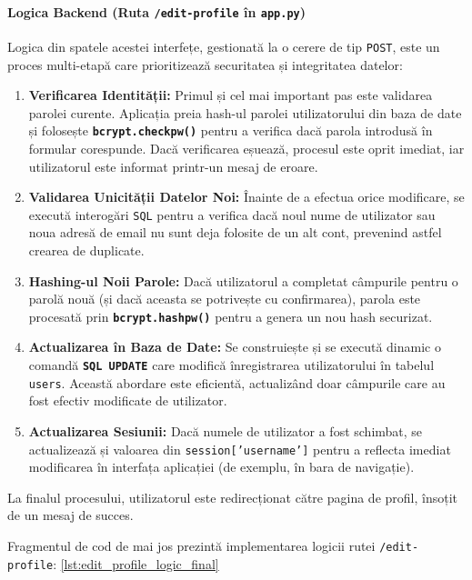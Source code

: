 \documentclass[12pt, a4paper, oneside, romanian]{teza-upb}
\begin{document}
\paragraph{Logica Backend (Ruta \texttt{/edit-profile} în \texttt{app.py})}
Logica din spatele acestei interfețe, gestionată la o cerere de tip \texttt{POST}, este un proces multi-etapă care prioritizează securitatea și integritatea datelor:
\begin{enumerate}
	\item \textbf{Verificarea Identității:} Primul și cel mai important pas este validarea parolei curente. Aplicația preia hash-ul parolei utilizatorului din baza de date și folosește \textbf{\texttt{bcrypt.checkpw()}} pentru a verifica dacă parola introdusă în formular corespunde. Dacă verificarea eșuează, procesul este oprit imediat, iar utilizatorul este informat printr-un mesaj de eroare.
	
	\item \textbf{Validarea Unicității Datelor Noi:} Înainte de a efectua orice modificare, se execută interogări \texttt{SQL} pentru a verifica dacă noul nume de utilizator sau noua adresă de email nu sunt deja folosite de un alt cont, prevenind astfel crearea de duplicate.
	
	\item \textbf{Hashing-ul Noii Parole:} Dacă utilizatorul a completat câmpurile pentru o parolă nouă (și dacă aceasta se potrivește cu confirmarea), parola este procesată prin \textbf{\texttt{bcrypt.hashpw()}} pentru a genera un nou hash securizat.
	
	\item \textbf{Actualizarea în Baza de Date:} Se construiește și se execută dinamic o comandă \textbf{\texttt{SQL UPDATE}} care modifică înregistrarea utilizatorului în tabelul \texttt{users}. Această abordare este eficientă, actualizând doar câmpurile care au fost efectiv modificate de utilizator.
	
	\item \textbf{Actualizarea Sesiunii:} Dacă numele de utilizator a fost schimbat, se actualizează și valoarea din \texttt{session['username']} pentru a reflecta imediat modificarea în interfața aplicației (de exemplu, în bara de navigație).
\end{enumerate}
La finalul procesului, utilizatorul este redirecționat către pagina de profil, însoțit de un mesaj de succes.

Fragmentul de cod de mai jos prezintă implementarea logicii rutei \texttt{/edit-profile}: \ref{lst:edit_profile_logic_final}
\end{document}
